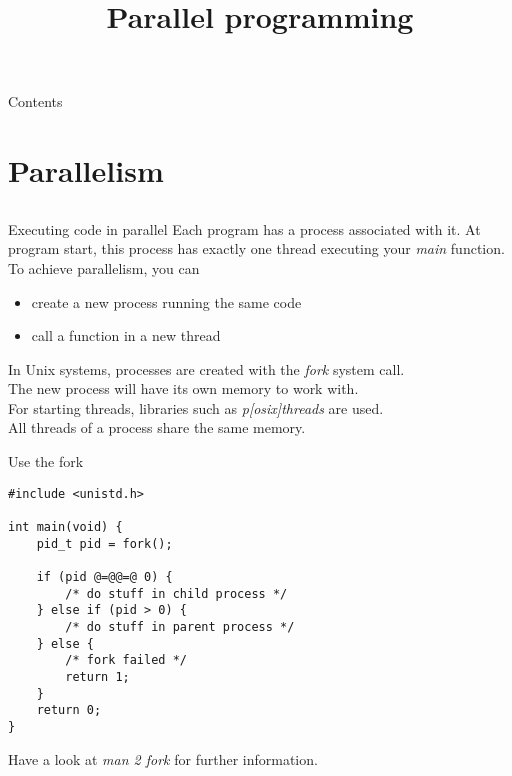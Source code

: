 
\newcommand{\topic}{
	Parallel programming
}

\title{\topic}
\supertitle{\course}
\date{}



\maketitle

\begin{frame}{Contents}
	\tableofcontents
\end{frame}

\section{Parallelism}
\subsection{}
\begin{frame}{Executing code in parallel}
    Each program has a process associated with it. At program start, this process has
    exactly one thread executing your \textit{main} function.\\
    \bigskip
    To achieve parallelism, you can
    \begin{itemize}
    		\item create a new process running the same code
    		\item call a function in a new thread
    \end{itemize}
    \bigskip
    In Unix systems, processes are created with the \textit{fork} system call.\\
    The new process will have its own memory to work with.\\
    For starting threads, libraries such as \textit{p[osix]threads} are used.\\
    All threads of a process share the same memory.
\end{frame}

\begin{frame}[fragile = singleslide]{Use the fork}
    \begin{lstlisting}
#include <unistd.h>

int main(void) {
    pid_t pid = fork();

    if (pid @=@@=@ 0) {
        /* do stuff in child process */
    } else if (pid > 0) {
        /* do stuff in parent process */
    } else {
        /* fork failed */
        return 1;
    }
    return 0;
}
\end{lstlisting}
    Have a look at \textit{man 2 fork} for further information.
\end{frame}

